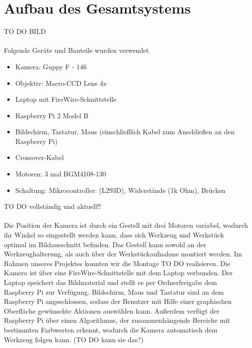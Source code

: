 \documentclass[12pt,a4paper,bibliography=totocnumbered,listof=totocnumbered]{scrartcl}
\begin{document}
\section{Aufbau des Gesamtsystems}
TO DO BILD \\ \\
Folgende Geräte und Bauteile wurden verwendet
\begin{itemize} 
\item Kamera: Guppy F - 146
\item Objektiv: Macro-CCD Lens 4x
\item Laptop mit FireWire-Schnittstelle
\item Raspberry Pi 2 Model B 
\item Bildschirm, Tastatur, Maus (einschließlich Kabel zum Anschließen an den Raspberry Pi)
\item Crossover-Kabel
\item Motoren: 3 mal BGM4108-130
\item Schaltung: Mikrocontroller: (L293D), Widerstände (1k Ohm), Brücken
\end{itemize}
TO DO vollständig und aktuell!! \\ \\
Die Position der Kamera ist durch ein Gestell mit drei Motoren variabel, wodurch ihr Winkel so eingestellt werden kann, dass sich Werkzeug und Werkstück optimal im Bildausschnitt befinden. Das Gestell kann sowohl an der Werkzeughalterung, als auch über der Werkstückaufnahme montiert werden. Im Rahmen unseres Projektes konnten wir die Montage TO DO realisieren.
Die Kamera ist über eine FireWire-Schnittstelle mit dem Laptop verbunden. Der Laptop speichert das Bildmaterial und stellt es per Ordnerfreigabe dem Raspberry Pi zur Verfügung. Bildschirm, Maus und Tastatur sind an dem Raspberry Pi angeschlossen, sodass der Benutzer mit Hilfe einer graphischen Oberfläche gewünschte Aktionen auswählen kann. Außerdem verfügt der Raspberry Pi über einen Algorithmus, der zusammenhängende Bereiche mit bestimmten Farbwerten erkennt, wodurch die Kamera automatisch dem Werkzeug folgen kann. (TO DO kann sie das?)
\end{document}
